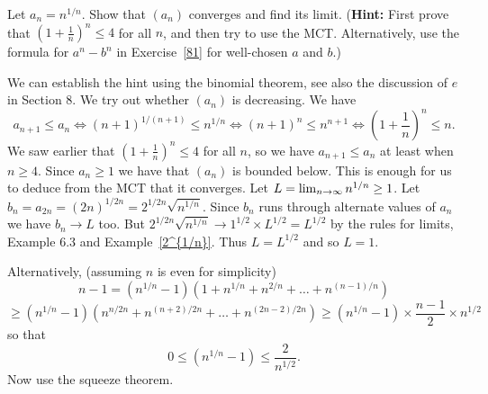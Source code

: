\documentclass[11pt,dvipsnames]{book}
\numberwithin{equation}{section} %
\numberwithin{figure}{section} %
\numberwithin{table}{section} %
\begin{document}
\begin{exercise}
Let $a_n = n^{1/n}$. Show that $(a_n)$ converges and find its limit. ({\bf Hint:} First prove that $(1+ \frac{1}{n})^n \leq 4$ for all $n$, and then try to use the MCT. Alternatively, use the formula for $a^n - b^n$ in Exercise~\ref{81} for well-chosen $a$ and $b$.)

\begin{solution}
We can establish the hint using the binomial theorem, see also the discussion of $e$ in Section 8. We try out whether $(a_n)$ is decreasing. We have
\[ a_{n+1} \leq a_n \iff (n+1)^{1/(n+1)} \leq n^{1/n} 
\iff (n+1)^n \leq n^{n+1} \iff \left(1 + \frac{1}{n}\right)^n \leq n.
\]
We saw earlier that $\left(1 + \frac{1}{n}\right)^n \leq 4$ for all $n$, so we have $a_{n+1} \leq a_n$ at least when $n \geq 4$. Since $a_n \geq 1$ we have that $(a_n)$
is bounded below. This is enough for us to deduce from the MCT that it converges. Let $L = \lim_{n\rightarrow\infty} n^{1/n} \geq 1$. Let $b_n = a_{2n} = (2n)^{1/2n} = 2^{1/2n} \sqrt{n^{1/n}}$. Since $b_n$ runs through alternate values of $a_n$ we have $b_n \to L$ too.
But $2^{1/2n} \sqrt{n^{1/n}} \to 1^{1/2} \times L^{1/2} = L^{1/2}$ by the rules for limits, Example 6.3 and Example~\ref{2^{1/n}}. Thus $L = L^{1/2}$ and so $L = 1$.

Alternatively, (assuming $n$ is even for simplicity)
\[ n - 1 = (n^{1/n} - 1)(1 + n^{1/n} + n^{2/n} + \dots + n^{(n-1)/n}) \]
\[\geq  (n^{1/n} - 1)(n^{n/2n} + n^{(n+2)/2n} + \dots + n^{(2n-2)/2n}) \geq (n^{1/n} - 1) \times \frac{n-1}{2} \times n^{1/2}\] so that 
\[ 0 \leq  (n^{1/n} - 1) \leq \frac{2}{n^{1/2}}.\]
Now use the squeeze theorem.
\end{solution}
\end{exercise}
\end{document}
